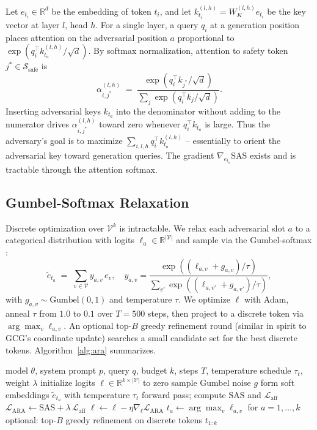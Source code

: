 \documentclass[sigconf,anonymous=false,review=false]{acmart}
\theoremstyle{definition}
\theoremstyle{remark}
\newcommand{\SAS}{\mathrm{SAS}}
\newcommand{\R}{\mathbb{R}}
\begin{document}
Let $e_{t_i} \in \R^d$ be the embedding of token $t_i$, and let $k^{(l,h)}_{t_i} = W_K^{(l,h)} e_{t_i}$ be the key vector at layer $l$, head $h$. For a single layer, a query $q_i$ at a generation position places attention on the adversarial position $a$ proportional to $\exp(q_i^\top k^{(l,h)}_{t_a}/\sqrt{d})$. By softmax normalization, attention to safety token $j^* \in \mathcal{S}_{\text{safe}}$ is
\[
\alpha^{(l,h)}_{i,j^*} \;=\; \frac{\exp(q_i^\top k_{j^*}/\sqrt{d})}{\sum_{j} \exp(q_i^\top k_j/\sqrt{d})}.
\]
Inserting adversarial keys $k_{t_a}$ into the denominator without adding to the numerator drives $\alpha^{(l,h)}_{i,j^*}$ toward zero whenever $q_i^\top k_{t_a}$ is large. Thus the adversary's goal is to maximize $\sum_{i,l,h} q_i^\top k^{(l,h)}_{t_a}$ -- essentially to orient the adversarial key toward generation queries. The gradient $\nabla_{e_{t_a}} \SAS$ exists and is tractable through the attention softmax.

\subsection{Gumbel-Softmax Relaxation}

Discrete optimization over $\mathcal{V}^k$ is intractable. We relax each adversarial slot $a$ to a categorical distribution with logits $\ell_a \in \R^{|\mathcal{V}|}$ and sample via the Gumbel-softmax \cite{jang2017gumbel,maddison2017concrete}:
\[
\tilde{e}_{t_a} \;=\; \sum_{v \in \mathcal{V}} y_{a,v} \, e_v, \quad y_{a,v} = \frac{\exp((\ell_{a,v}+g_{a,v})/\tau)}{\sum_{v'} \exp((\ell_{a,v'}+g_{a,v'})/\tau)},
\]
with $g_{a,v} \sim \mathrm{Gumbel}(0,1)$ and temperature $\tau$. We optimize $\ell$ with Adam, anneal $\tau$ from $1.0$ to $0.1$ over $T{=}500$ steps, then project to a discrete token via $\arg\max_v \ell_{a,v}$. An optional top-$B$ greedy refinement round (similar in spirit to GCG's coordinate update) searches a small candidate set for the best discrete tokens. Algorithm~\ref{alg:ara} summarizes.

\begin{algorithm}[t]
\caption{ARA attack construction}
\label{alg:ara}
\begin{algorithmic}[1]
\Require model $\theta$, system prompt $p$, query $q$, budget $k$, steps $T$, temperature schedule $\tau_t$, weight $\lambda$
\State initialize logits $\ell \in \R^{k \times |\mathcal{V}|}$ to zero
  \State sample Gumbel noise $g$
  \State form soft embeddings $\tilde{e}_{t_a}$ with temperature $\tau_t$
  \State forward pass; compute $\SAS$ and $\mathcal{L}_{\mathrm{aff}}$
  \State $\mathcal{L}_{\mathrm{ARA}} \gets \SAS + \lambda \, \mathcal{L}_{\mathrm{aff}}$
  \State $\ell \gets \ell - \eta \nabla_\ell \mathcal{L}_{\mathrm{ARA}}$
\EndFor
\State $t_a \gets \arg\max_v \ell_{a,v}$ for $a=1,\dots,k$
\State optional: top-$B$ greedy refinement on discrete tokens
\State \Return $t_{1:k}$
\end{algorithmic}
\end{algorithm}
\end{document}
